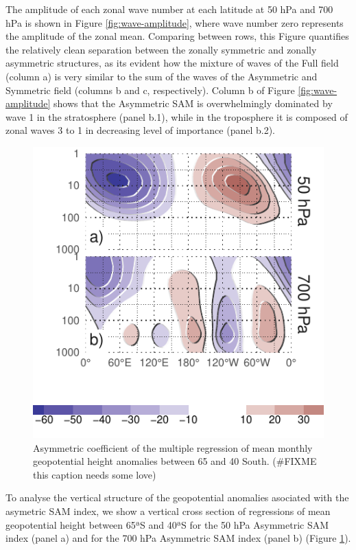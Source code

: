 \documentclass[]{ametsocV5}
\begin{document}
The amplitude of each zonal wave number at each latitude at 50 hPa and
700 hPa is shown in Figure \ref{fig:wave-amplitude}, where wave number
zero represents the amplitude of the zonal mean. Comparing between rows,
this Figure quantifies the relatively clean separation between the
zonally symmetric and zonally asymmetric structures, as its evident how
the mixture of waves of the Full field (column a) is very similar to the
sum of the waves of the Asymmetric and Symmetric field (columns b and c,
respectively). Column b of Figure \ref{fig:wave-amplitude} shows that
the Asymmetric SAM is overwhelmingly dominated by wave 1 in the
stratosphere (panel b.1), while in the troposphere it is composed of
zonal waves 3 to 1 in decreasing level of importance (panel b.2).

\begin{figure}
\includegraphics{vertical-regression-1} \caption[Asymmetric coefficient of the multiple regression of mean monthly geopotential height anomalies between 65 and 40 South]{Asymmetric coefficient of the multiple regression of mean monthly geopotential height anomalies between 65 and 40 South. (\#FIXME this caption needs some love)}\label{fig:vertical-regression}
\end{figure}

To analyse the vertical structure of the geopotential anomalies
asociated with the asymetric SAM index, we show a vertical cross section
of regressions of mean geopotential height between 65ªS and 40ªS for the
50 hPa Asymmetric SAM index (panel a) and for the 700 hPa Asymmetric SAM
index (panel b) (Figure \ref{fig:vertical-regression}).
\end{document}

